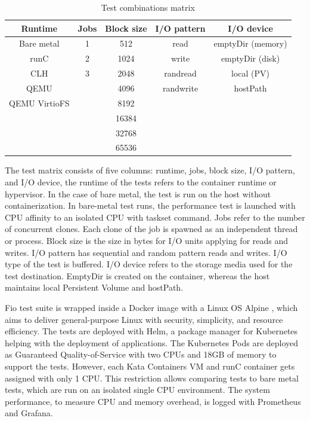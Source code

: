 \begin{table}[ht]
\centering
\caption{Test combinations matrix}
\vspace{\baselineskip}
\begin{tabular}{| c | c | c | c | c |}
\hline
\textbf{Runtime} & \textbf{Jobs} & \textbf{Block size} & \textbf{I/O pattern} & \textbf{I/O device} \\ 
\hline
Bare metal & 1 & 512 & read & emptyDir (memory) \\
\hline
runC & 2 & 1024 & write & emptyDir (disk) \\ 
\hline
CLH & 3 & 2048 & randread & local (PV) \\
\hline
QEMU & & 4096 & randwrite & hostPath \\
\hline
QEMU VirtioFS & & 8192 & & \\
\hline
& & 16384 & & \\
\hline
& & 32768 & & \\
\hline
& & 65536 & & \\
\hline
\end{tabular}
\label{table:TestMatrix}
\end{table}

The test matrix consists of five columns: runtime, jobs, block size, I/O pattern, and I/O device, the runtime of the tests refers to the container runtime or hypervisor. In the case of bare metal, the test is run on the host without containerization. In bare-metal test runs, the performance test is launched with CPU affinity to an isolated CPU with taskset \cite{taskset} command. Jobs refer to the number of concurrent clones. Each clone of the job is spawned as an independent thread or process. Block size is the size in bytes for I/O units applying for reads and writes. I/O pattern has sequential and random pattern reads and writes. I/O type of the test is buffered. I/O device refers to the storage media used for the test destination. EmptyDir is created on the container, whereas the host maintains local Persistent Volume and hostPath.

Fio test suite is wrapped inside a Docker image with a Linux OS Alpine \cite{Alpine}, which aims to deliver general-purpose Linux with security, simplicity, and resource efficiency. The tests are deployed with Helm\cite{Helm}, a package manager for Kubernetes helping with the deployment of applications. The Kubernetes Pods are deployed as Guaranteed Quality-of-Service with two CPUs and 18GB of memory to support the tests. However, each Kata Containers VM and runC container gets assigned with only 1 CPU. This restriction allows comparing tests to bare metal tests, which are run on an isolated single CPU environment. The system performance, to measure CPU and memory overhead, is logged with Prometheus and Grafana.

